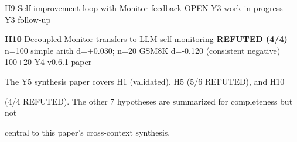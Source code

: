 \documentclass[11pt]{article}
\begin{document}
H9 \textbar{} Self-improvement loop with Monitor feedback \textbar{}
OPEN \textbar{} Y3 work in progress \textbar{} - \textbar{} Y3 follow-up
\textbar{}

\textbf{H10} \textbar{} Decoupled Monitor transfers to LLM
self-monitoring \textbar{} \textbf{REFUTED (4/4)} \textbar{} n=100
simple arith d=+0.030; n=20 GSM8K d=-0.120 (consistent negative)
\textbar{} 100+20 \textbar{} Y4 v0.6.1 paper \textbar{}

The Y5 synthesis paper covers H1 (validated), H5 (5/6 REFUTED), and H10

(4/4 REFUTED). The other 7 hypotheses are summarized for completeness
but not

central to this paper's cross-context synthesis.
\end{document}
